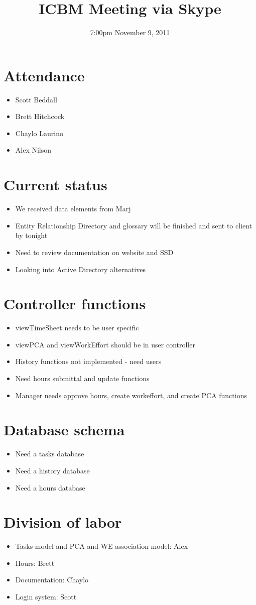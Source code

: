 \documentclass{article}
\begin{document}
\title{ICBM Meeting via Skype}
\date{7:00pm November 9, 2011}
\maketitle

\section{Attendance}
\begin{itemize}
\item Scott Beddall
\item Brett Hitchcock
\item Chaylo Laurino
\item Alex Nilson
\end{itemize}

\section{Current status}
\begin{itemize}
\item We received data elements from Marj
\item Entity Relationship Directory and glossary will be finished and sent to client by tonight
\item Need to review documentation on website and SSD
\item Looking into Active Directory alternatives
\end{itemize}

\section{Controller functions}
\begin{itemize}
\item viewTimeSheet needs to be user specific
\item viewPCA and viewWorkEffort should be in user controller
\item History functions not implemented - need users
\item Need hours submittal and update functions
\item Manager needs approve hours, create workeffort, and create PCA functions
\end{itemize}

\section{Database schema}
\begin{itemize}
\item Need a tasks database
\item Need a history database
\item Need a hours database
\end{itemize}

\section{Division of labor}
\begin{itemize}
\item Tasks model and PCA and WE association model:  Alex
\item Hours: Brett
\item Documentation: Chaylo
\item Login system: Scott
\end{itemize}
\end{document}
